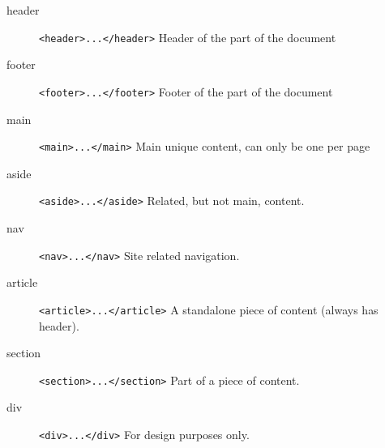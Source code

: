 \begin{description}
	\item[header] \texttt{<header>...</header>} Header of the part of the document
	\item[footer] \texttt{<footer>...</footer>} Footer of the part of the document
	\item[main] \texttt{<main>...</main>} Main unique content, can only be one per page
	\item[aside] \texttt{<aside>...</aside>} Related, but not main, content.
	\item[nav] \texttt{<nav>...</nav>} Site related navigation.
	\item[article] \texttt{<article>...</article>} A standalone piece of content (always has header).
	\item[section] \texttt{<section>...</section>} Part of a piece of content.
	\item[div] \texttt{<div>...</div>} For design purposes only.
\end{description}
